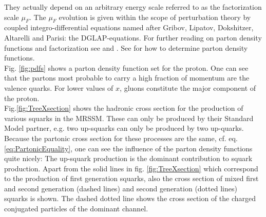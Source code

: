 They actually depend on an arbitrary energy scale referred to as the factorization scale $\mu_F$. The $\mu_F$ evolution is given within the scope of perturbation theory by coupled integro-differential equations named after Gribov, Lipatov\cite{Gribov:1972ri}, Dokshitzer\cite{Dokshitzer:1977sg}, Altarelli and Parisi\cite{Altarelli:1977zs}: the DGLAP-equations. For further reading on parton density functions and factorization see \cite{dissertori2003quantum} and \cite{Collins:1989gx}. See \cite{Brock:1993sz} for how to determine parton density functions.\\
Fig. \ref{fig:pdfs} shows a parton density function set for the proton. One can see that the partons most probable to carry a high fraction of momentum are the valence quarks. For lower values of $x$, gluons constitute the major component of the proton.\\
Fig.\ref{fig:TreeXsection} shows the hadronic cross section for the production of various squarks in the MRSSM. These can only be produced by their Standard Model partner, e.g. two up-squarks can only be produced by two up-quarks. Because the partonic cross section for these processes are the same, cf. eq. \eqref{eq:PartonicEquality}, one can see the influence of the parton density functions quite nicely: The up-squark production is the dominant contribution to squark production. Apart from the solid lines in fig. \ref{fig:TreeXsection} which correspond to the production of first generation squarks, also the cross section of mixed first and second generation (dashed lines) and second generation (dotted lines) squarks is shown. The dashed dotted line shows the cross section of the charged conjugated particles of the dominant channel.\\


